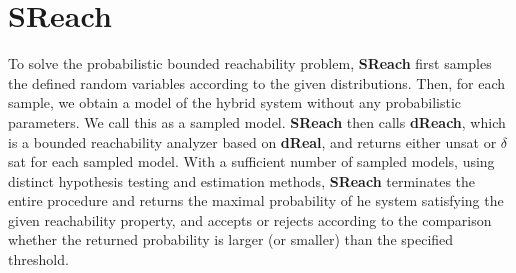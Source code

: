 \section{SReach}
To solve the probabilistic bounded reachability problem, {\bf SReach} first samples the defined random variables according to the given distributions. Then, for each sample, we obtain a model of the hybrid system without any probabilistic parameters. We call this as a sampled model. {\bf SReach} then calls {\bf dReach}, which is a bounded reachability analyzer based on {\bf dReal}, and returns either unsat or $\delta$ sat for each sampled model. With a sufficient number of sampled models, using distinct hypothesis testing and estimation methods, {\bf SReach} terminates the entire procedure and returns the maximal probability of he system satisfying the given reachability property, and accepts or rejects according to the comparison whether the returned probability is larger (or smaller) than the specified threshold.

